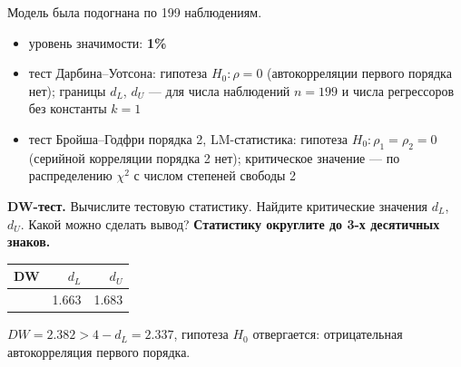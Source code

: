 \documentclass[
  russian,
]{article}
\newcounter{none} %
\providecommand{\tightlist}{%
  \setlength{\itemsep}{0pt}\setlength{\parskip}{0pt}}
\begin{document}
Модель была подогнана по 199 наблюдениям.

\begin{tcolorbox}[enhanced jigsaw, arc=.35mm, bottomrule=.15mm, bottomtitle=1mm, breakable, colback=white, colbacktitle=quarto-callout-important-color!10!white, colframe=quarto-callout-important-color-frame, coltitle=black, left=2mm, leftrule=.75mm, opacityback=0, opacitybacktitle=0.6, rightrule=.15mm, title=\textcolor{quarto-callout-important-color}{\faExclamation}\hspace{0.5em}{Условия теста}, titlerule=0mm, toprule=.15mm, toptitle=1mm]

\begin{itemize}
\tightlist
\item
  уровень значимости: \textbf{1\%}
\item
  тест Дарбина--Уотсона: гипотеза \(H_0:\rho=0\) (автокорреляции первого
  порядка нет); границы \(d_L\), \(d_U\) --- для числа наблюдений
  \(n=199\) и числа регрессоров без константы \(k=1\)
\item
  тест Бройша--Годфри порядка 2, LM-статистика: гипотеза
  \(H_0:\rho_1=\rho_2=0\) (серийной корреляции порядка 2 нет);
  критическое значение --- по распределению \(\chi^2\) с числом степеней
  свободы 2
\end{itemize}

\end{tcolorbox}

\textbf{DW-тест.} Вычислите тестовую статистику. Найдите критические
значения \(d_L\), \(d_U\). Какой можно сделать вывод? \textbf{Статистику
округлите до 3-х десятичных знаков.}

{\def\LTcaptype{none} %
\begin{longtable}[]{@{}rrr@{}}
\toprule\noalign{}
DW & \(d_L\) & \(d_U\) \\
\midrule\noalign{}
\endhead
\bottomrule\noalign{}
\endlastfoot
2.382 & 1.663 & 1.683 \\
\end{longtable}
}

\begin{tcolorbox}[enhanced jigsaw, arc=.35mm, bottomrule=.15mm, bottomtitle=1mm, breakable, colback=white, colbacktitle=quarto-callout-tip-color!10!white, colframe=quarto-callout-tip-color-frame, coltitle=black, left=2mm, leftrule=.75mm, opacityback=0, opacitybacktitle=0.6, rightrule=.15mm, title=\textcolor{quarto-callout-tip-color}{\faLightbulb}\hspace{0.5em}{Вывод (DW-тест)}, titlerule=0mm, toprule=.15mm, toptitle=1mm]

\(DW = 2.382 > 4 - d_L = 2.337\), гипотеза \(H_0\) отвергается:
отрицательная автокорреляция первого порядка.

\end{tcolorbox}
\end{document}
